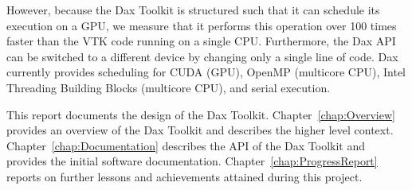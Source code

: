 However, because the Dax Toolkit is structured such that it can schedule
its execution on a GPU, we measure that it performs this operation over 100
times faster than the VTK code running on a single CPU. Furthermore, the
Dax API can be switched to a different device by changing only a single
line of code. Dax currently provides scheduling for CUDA (GPU), OpenMP
(multicore CPU), Intel Threading Building Blocks (multicore CPU), and
serial execution.

This report documents the design of the Dax
Toolkit. Chapter~\ref{chap:Overview} provides an overview of the Dax
Toolkit and describes the higher level
context. Chapter~\ref{chap:Documentation} describes the API of the Dax
Toolkit and provides the initial software
documentation. Chapter~\ref{chap:ProgressReport} reports on further lessons
and achievements attained during this project.
